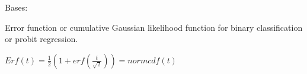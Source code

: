 \documentclass[letterpaper,10pt,english]{sphinxmanual}
\begin{document}
\begin{fulllineitems}
\label{pyGPs.Core:pyGPs.Core.lik.Erf}
Bases: {\hyperref[Likelihoods:pyGPs.Core.lik.Likelihood]{}}

Error function or cumulative Gaussian likelihood function for binary
classification or probit regression.

$Erf(t)=\frac{1}{2}(1+erf(\frac{t}{\sqrt{2}}))=normcdf(t)$

\begin{fulllineitems}
\label{pyGPs.Core:pyGPs.Core.lik.Erf.cumGauss}
\end{fulllineitems}


\begin{fulllineitems}
\label{pyGPs.Core:pyGPs.Core.lik.Erf.gauOverCumGauss}
\end{fulllineitems}


\begin{fulllineitems}
\label{pyGPs.Core:pyGPs.Core.lik.Erf.logphi}
\end{fulllineitems}


\begin{fulllineitems}
\label{pyGPs.Core:pyGPs.Core.lik.Erf.proceed}
\end{fulllineitems}


\end{fulllineitems}

\end{document}
